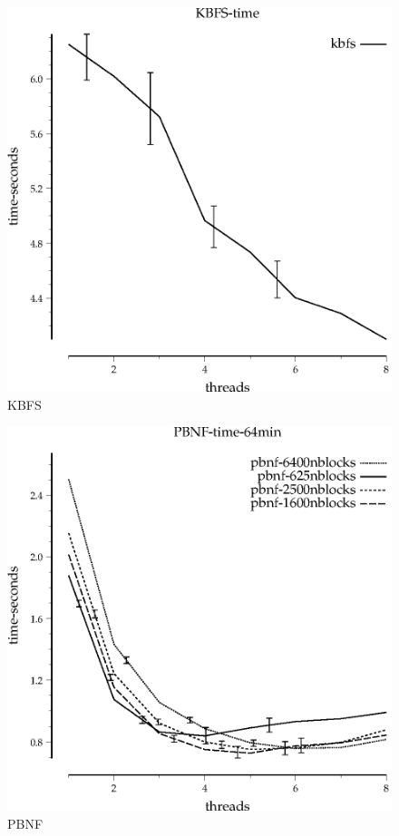 \documentclass{article}
\begin{document}
\begin{figure}
\begin{center}
\includegraphics{KBFS-time}
\end{center}
\caption{KBFS}
\end{figure}

\begin{figure}
\begin{center}
\includegraphics{PBNF-time-64min}
\end{center}
\caption{PBNF}
\end{figure}
\end{document}
